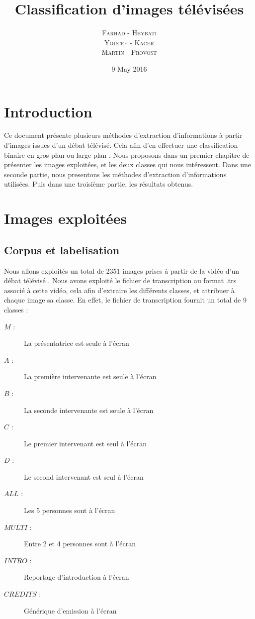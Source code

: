 \documentclass{book}
\title{Classification d'images télévisées}
\author{\textsc{Farhad} - \textsc{Heybati}\\
\textsc{Youcef} - \textsc{Kacer}\\
\textsc{Martin} - \textsc{Provost}}
\date{9 May 2016}
\begin{document}
 
\maketitle

\tableofcontents

\frontmatter
\chapter{Introduction}
Ce document présente plusieurs méthodes d'extraction d'informations à partir d'images issues d'un débat télévisé.
Cela afin d'en effectuer une classification binaire en \og gros plan \fg{} ou \og large plan \fg{}.
Nous proposons dans un premier chapître de présenter les images exploitées, et les deux classes qui nous intéressent.
Dans une seconde partie, nous presentons les méthodes d'extraction d'informations utilisées.
Puis dans une troisième partie, les résultats obtenus.

\mainmatter
\chapter{Images exploitées}
\section{Corpus et labelisation}\label{labelisation}
Nous allons exploités un total de 2351 images prises à partir de la vidéo d'un débat télévisé \cite{ref} .
Nous avons exploité le fichier de transcription au format .trs \cite{ref} associé à cette vidéo, cela afin d'extraire les différents classes, et attribuer à chaque image sa classe.
En effet, le fichier de transcription fournit un total de 9 classes : \\


\begin{description} %

\item[$M$ :] La présentatrice est seule à l'écran
\item[$A$ :] La première intervenante est seule à l'écran
\item[$B$ :] La seconde intervenante est seule à l'écran
\item[$C$ :] Le premier intervenant est seul à l'écran
\item[$D$ :] Le second intervenant est seul à l'écran
\item[$ALL$ :] Les 5 personnes sont à l'écran
\item[$MULTI$ :] Entre 2 et 4 personnes sont à l'écran
\item[$INTRO$ :] Reportage d'introduction à l'écran
\item[$CREDITS$ :] Générique d'emission à l'écran\\

\end{description}
\end{document}
